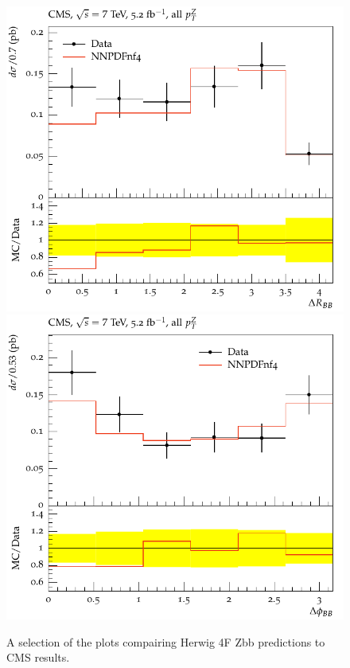 \documentclass[11pt]{cernrep} \usepackage{graphicx,epsfig} 
\begin{document}
\begin{figure}[htbp]
   \includegraphics[scale=0.65]{figs/zbb/herwig4F/d01-x01-y01.pdf} 
   \includegraphics[scale=0.65]{figs/zbb/herwig4F/d02-x01-y01.pdf} 
\caption{A selection of the plots compairing Herwig 4F Zbb predictions to CMS results.}
\label{zbb-herwig4F-cms}
\end{figure}
\end{document}
